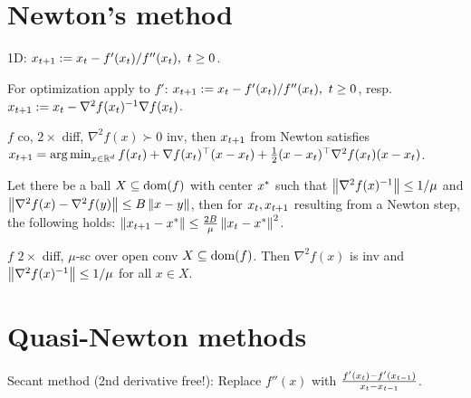 \section*{Newton's method}

1D: $x_{{t+1}} := x_t - f'(x_t) / f''(x_t), \ t \geq 0$.

For optimization apply to $f'$: $x_{{t+1}} := x_t - f'(x_t) / f''(x_t), \ t \geq 0$, resp. $x_{{t+1}} := x_t - \nabla^2 f(x_t)^{-1} \nabla f(x_t)$.

$f$ co, $2\times$ diff, $\nabla^2 f(x) \succ 0$ inv, then $x_{{t+1}}$ from Newton satisfies $x_{{t+1}} = \operatorname*{arg\,min}_{x \in \mathbb{R}^d} f(x_t) + \nabla f(x_t)^\top (x - x_t) + \frac{1}{2} (x - x_t)^\top \nabla^2 f(x_t) (x - x_t)$.

Let there be a ball $X \subseteq \operatorname*{\text{dom}}(f)$ with center $x^*$ such that $\left\lVert \nabla^2 f(x)^{-1} \right\rVert \leq 1/\mu$ and $\left\lVert \nabla^2 f(x) - \nabla^2 f(y) \right\rVert \leq B \left\lVert x - y \right\rVert$, then for $x_t, x_{{t+1}}$ resulting from a Newton step, the following holds: $\left\lVert x_{{t+1}} - x^* \right\rVert \leq \frac{2B}{\mu} \left\lVert x_t - x^* \right\rVert^2$.


$f$ $2\times$ diff, $\mu$-sc over open conv $X \subseteq \operatorname*{\text{dom}}(f)$. Then $\nabla^2 f(x)$ is inv and $\left\lVert \nabla^2 f(x)^{-1} \right\rVert \leq 1/\mu$ for all $x \in X$.


\section*{Quasi-Newton methods}

Secant method (2nd derivative free!): Replace $f''(x)$ with $\frac{f'(x_t) - f'(x_{{t-1}})}{x_t - x_{{t-1}}}$. 

